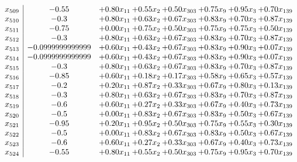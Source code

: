 \documentclass[8pt]{article}
\begin{document}
\[\begin{array}{c| c c@{\hskip 2pt} c@{\hskip 2pt} c@{\hskip 2pt} c@{\hskip 2pt} c@{\hskip 2pt} c@{\hskip 2pt} }
 x_{509}   &  -0.55 & +  0.80 x_{11} & +  0.55 x_{2} & +  0.50 x_{303} & +  0.75 x_{9} & +  0.95 x_{3} & +  0.70 x_{139}\\
 x_{510}   &  -0.3 & +  0.80 x_{11} & +  0.63 x_{2} & +  0.67 x_{303} & +  0.83 x_{9} & +  0.70 x_{3} & +  0.87 x_{139}\\
 x_{511}   &  -0.75 & +  0.00 x_{11} & +  0.75 x_{2} & +  0.50 x_{303} & +  0.75 x_{9} & +  0.75 x_{3} & +  0.50 x_{139}\\
 x_{512}   &  -0.3 & +  0.80 x_{11} & +  0.63 x_{2} & +  0.67 x_{303} & +  0.83 x_{9} & +  0.70 x_{3} & +  0.87 x_{139}\\
 x_{513}   &  -0.0999999999999 & +  0.60 x_{11} & +  0.43 x_{2} & +  0.67 x_{303} & +  0.83 x_{9} & +  0.90 x_{3} & +  0.07 x_{139}\\
 x_{514}   &  -0.0999999999999 & +  0.60 x_{11} & +  0.43 x_{2} & +  0.67 x_{303} & +  0.83 x_{9} & +  0.90 x_{3} & +  0.07 x_{139}\\
 x_{515}   &  -0.3 & +  0.80 x_{11} & +  0.63 x_{2} & +  0.67 x_{303} & +  0.83 x_{9} & +  0.70 x_{3} & +  0.87 x_{139}\\
 x_{516}   &  -0.85 & +  0.60 x_{11} & +  0.18 x_{2} & +  0.17 x_{303} & +  0.58 x_{9} & +  0.65 x_{3} & +  0.57 x_{139}\\
 x_{517}   &  -0.2 & +  0.20 x_{11} & +  0.87 x_{2} & +  0.33 x_{303} & +  0.67 x_{9} & +  0.80 x_{3} & +  0.13 x_{139}\\
 x_{518}   &  -0.3 & +  0.80 x_{11} & +  0.63 x_{2} & +  0.67 x_{303} & +  0.83 x_{9} & +  0.70 x_{3} & +  0.87 x_{139}\\
 x_{519}   &  -0.6 & +  0.60 x_{11} & +  0.27 x_{2} & +  0.33 x_{303} & +  0.67 x_{9} & +  0.40 x_{3} & +  0.73 x_{139}\\
 x_{520}   &  -0.5 & +  0.00 x_{11} & +  0.83 x_{2} & +  0.67 x_{303} & +  0.83 x_{9} & +  0.50 x_{3} & +  0.67 x_{139}\\
 x_{521}   &  -0.95 & +  0.20 x_{11} & +  0.95 x_{2} & +  0.50 x_{303} & +  0.75 x_{9} & +  0.55 x_{3} & +  0.30 x_{139}\\
 x_{522}   &  -0.5 & +  0.00 x_{11} & +  0.83 x_{2} & +  0.67 x_{303} & +  0.83 x_{9} & +  0.50 x_{3} & +  0.67 x_{139}\\
 x_{523}   &  -0.6 & +  0.60 x_{11} & +  0.27 x_{2} & +  0.33 x_{303} & +  0.67 x_{9} & +  0.40 x_{3} & +  0.73 x_{139}\\
 x_{524}   &  -0.55 & +  0.80 x_{11} & +  0.55 x_{2} & +  0.50 x_{303} & +  0.75 x_{9} & +  0.95 x_{3} & +  0.70 x_{139}\\

\end{array}\]
\end{document}
